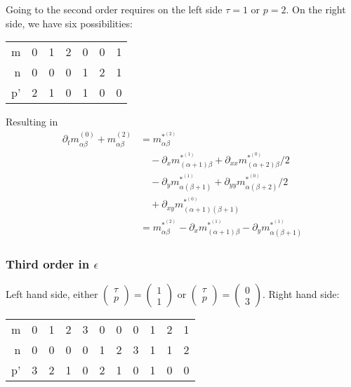 Going to the second order requires on the left side $\tau=1$ or $p=2$.
On the right side, we have six possibilities:
\begin{center}
  \begin{tabular} {r || c | *{2}{c} | *{2}{c} | c}
    m  & 0 & 1 & 2 & 0 & 0 & 1 \\
    n  & 0 & 0 & 0 & 1 & 2 & 1 \\
    p' & 2 & 1 & 0 & 1 & 0 & 0
  \end{tabular}
\end{center}
Resulting in
\begin{equation}
  \label{eq:second order in epsilon}
  \begin{aligned}
    \partial_t m_{\alpha\beta}^{(0)} + m_{\alpha\beta}^{(2)}
    & =  m_{\alpha\beta}^{*^{(2)}} \\
    &\quad - \partial_x m_{(\alpha+1)\beta}^{*^{(1)}} + \partial_{xx} m_{(\alpha+2)\beta}^{*^{(0)}}/2 \\
    &\quad - \partial_y m_{\alpha(\beta+1)}^{*^{(1)}} + \partial_{yy} m_{\alpha(\beta+2)}^{*^{(0)}}/2 \\
    &\quad + \partial_{xy} m_{(\alpha+1)(\beta+1)}^{*^{(0)}}\\
    & =  m_{\alpha\beta}^{*^{(2)}} - \partial_x m_{(\alpha+1)\beta}^{*^{(1)}} - \partial_y m_{\alpha(\beta+1)}^{*^{(1)}}
  \end{aligned}
\end{equation}


\subsubsection{Third order in \texorpdfstring{$\epsilon$}{epsilon}}
\label{subs:Third order in epsilon}

Left hand side, either $\begin{pmatrix}\tau \\ p\end{pmatrix} = \begin{pmatrix} 1 \\ 1 \end{pmatrix}$ or $\begin{pmatrix}\tau \\ p\end{pmatrix} = \begin{pmatrix} 0 \\ 3 \end{pmatrix}$.\newline
Right hand side:
\begin{center}
  \begin{tabular} {r || c | *{3}{c} | *{3}{c} | *{3}{c} }
    m  & 0 & 1 & 2 & 3 & 0 & 0 & 0 & 1 & 2 & 1 \\
    n  & 0 & 0 & 0 & 0 & 1 & 2 & 3 & 1 & 1 & 2 \\
    p' & 3 & 2 & 1 & 0 & 2 & 1 & 0 & 1 & 0 & 0
  \end{tabular}
\end{center}

